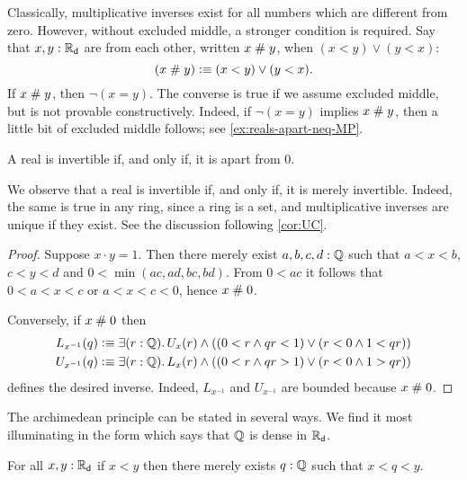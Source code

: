 Classically, multiplicative inverses exist for all numbers which are different from zero.
However, without excluded middle, a stronger condition is required. Say that $x, y : \mathbb{R}_\mathsf{d}$
are 
%
from each other, written $x \mathrel{\#} y$, when $(x < y) \lor (y < x)$:
%
\begin{equation*}
  (x \mathrel{\#} y) \vcentcolon\equiv (x < y) \lor (y < x).
\end{equation*}
%
If $x \mathrel{\#} y$, then $\lnot (x = y)$.
The converse is true if we assume excluded middle, but is not provable constructively.
Indeed, if $\lnot (x = y)$ implies $x\mathrel{\#} y$, then a little bit of excluded middle follows; see \autoref{ex:reals-apart-neq-MP}.

\begin{thm} \label{RD-inverse-apart-0}
  A real is invertible if, and only if, it is apart from $0$.
\end{thm}

\begin{rmk}
  We observe that a real is invertible if, and only if, it is merely
  invertible.  Indeed, the same is true in any ring, since a ring is a set, and
  multiplicative inverses are unique if they exist.  See the discussion
  following \autoref{cor:UC}.
\end{rmk}

\begin{proof}
  Suppose $x \cdot y = 1$. Then there merely exist $a, b, c, d : \mathbb{Q}$ such that
  $a < x < b$, $c < y < d$ and $0 < \min (a c, a d, b c, b d)$. From $0 < a c$ it follows
  that $0 < a < x < c$ or $a < x < c < 0$, hence $x \mathrel{\#} 0$.

  Conversely, if $x \mathrel{\#} 0$ then
  \begin{align*}
    L_{x^{-1}}(q) &\defeq
    \exis{r : \Q} U_x(r) \land ((0 < r \land q r < 1) \lor (r < 0 \land 1 < q r))
    \\
    U_{x^{-1}}(q) &\defeq
    \exis{r : \Q} L_x(r) \land ((0 < r \land q r > 1) \lor (r < 0 \land 1 > q r))
  \end{align*}
  defines the desired inverse. Indeed, $L_{x^{-1}}$ and $U_{x^{-1}}$ are bounded because
  $x \mathrel{\#} 0$.
\end{proof}

%
The archimedean principle can be stated in several ways. We find it most illuminating in the
form which says that $\mathbb{Q}$ is dense in $\mathbb{R}_\mathsf{d}$.

\begin{thm} \label{RD-archimedean}
  For all $x, y : \mathbb{R}_\mathsf{d}$ if $x < y$ then there merely exists $q : \mathbb{Q}$ such that
  $x < q < y$.
\end{thm}

